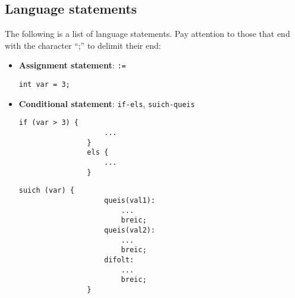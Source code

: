 \documentclass[10pt,a4paper]{article}
\begin{document}
\subsection{Language statements}\label{subsec:Instrucciones del lenguaje}
The following is a list of language statements. Pay attention to those that end with the character ``;'' to delimit their end:
\begin{itemize}
    \item \textbf{Assignment statement}: \texttt{:=}
    \begin{center}
        \begin{minipage}{\linewidth}
            \begin{lstlisting}[linewidth=0.3\linewidth, gobble=16]
                int var = 3;
            \end{lstlisting}
        \end{minipage}
    \end{center}
    
    \item \textbf{Conditional statement}: \texttt{if-els}, \texttt{suich-queis}
    \begin{center}
        \begin{minipage}{\linewidth}
            \begin{lstlisting}[linewidth=0.3\linewidth, gobble=16]
                if (var > 3) {
                    ...
                }
                els {
                    ...
                }
            \end{lstlisting}
        \end{minipage}
    \end{center}
    \begin{center}
        \begin{minipage}{\linewidth}
            \begin{lstlisting}[linewidth=0.3\linewidth, gobble=16]
                suich (var) {
                    queis(val1):
                        ...
                        breic;
                    queis(val2):
                        ...
                        breic;
                    difolt:
                        ...
                        breic;
                }
            \end{lstlisting}
        \end{minipage}
    \end{center}


\end{itemize}
\end{document}
